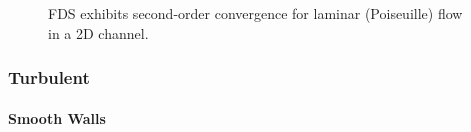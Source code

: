 \documentclass[11pt]{book}
\begin{document}
\begin{figure}
   \begin{center}
      \caption[Convergence for laminar (Poiseuille) flow in a 2D channel]{\label{fig_poiseuille_convergence} FDS exhibits second-order convergence for laminar (Poiseuille) flow in a 2D channel.}
   \end{center}
\end{figure}


\subsubsection{Turbulent}
\label{turbulent}

\paragraph{Smooth Walls}
\end{document}
